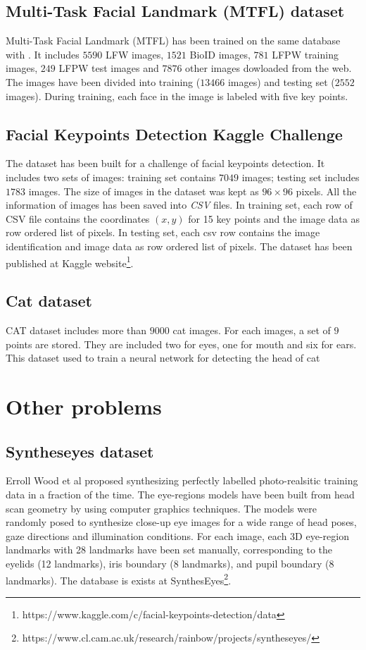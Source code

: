 \subsection{Multi-Task Facial Landmark (MTFL) dataset}
Multi-Task Facial Landmark (MTFL) has been trained on the same database with \cite{sun2013deep}. It includes $5590$ LFW images, $1521$ BioID images, $781$ LFPW training images, $249$ LFPW test images and $7876$ other images dowloaded from the web. The images have been divided into training ($13466$ images) and testing set ($2552$ images). During training, each face in the image is labeled with five key points. 
\subsection{Facial Keypoints Detection Kaggle Challenge}
The dataset has been built for a challenge of facial keypoints detection. It includes two sets of images: training set contains $7049$ images; testing set includes $1783$ images. The size of images in the dataset was kept as $96 \times 96$ pixels. All the information of images has been saved into \textit{CSV} files. In training set, each row of CSV file contains the coordinates $(x,y)$ for 15 key points and the image data as row ordered list of pixels. In testing set, each csv row contains the image identification and image data as row ordered list of pixels. The dataset has been published at Kaggle website\footnote{https://www.kaggle.com/c/facial-keypoints-detection/data}.

\subsection{Cat dataset}
CAT dataset \cite{} includes more than $9000$ cat images. For each images, a set of $9$ points are stored. They are included two for eyes, one for mouth and six for ears. This dataset used to train a neural network for detecting the head of cat
\section{Other problems}
\subsection{Syntheseyes dataset}
Erroll Wood et al \cite{wood2015_iccv} proposed synthesizing perfectly labelled photo-realsitic training data in a fraction of the time. The eye-regions models have been built from head scan geometry by using computer graphics techniques. The models were randomly posed to synthesize close-up eye images for a wide range of head poses, gaze directions and illumination conditions. For each image, each 3D eye-region landmarks with 28 landmarks have been set manually, corresponding to the eyelids (12 landmarks), iris boundary (8 landmarks), and pupil boundary (8 landmarks).
The database is exists at SynthesEyes\footnote{https://www.cl.cam.ac.uk/research/rainbow/projects/syntheseyes/}.
